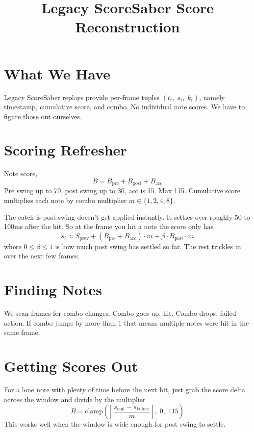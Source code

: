 \documentclass[11pt]{article}
\title{Legacy ScoreSaber Score Reconstruction}
\author{}
\date{}
\begin{document}
   \maketitle

   \section{What We Have}

   Legacy ScoreSaber replays provide per-frame tuples $(t_{i},\; s_{i},\; k_{i})$,
   namely timestamp, cumulative score, and combo. No individual note scores. We
   have to figure those out ourselves.

   \section{Scoring Refresher}

   Note score,
   \[
      B = B_{\text{pre}}+ B_{\text{post}}+ B_{\text{acc}}
   \]
   Pre swing up to 70, post swing up to 30, acc is 15. Max 115. Cumulative score
   multiplies each note by combo multiplier $m \in \{1, 2, 4, 8\}$.

   The catch is post swing doesn't get applied instantly. It settles over roughly
   50 to 100ms after the hit. So at the frame you hit a note the score only has
   \[
      s_{i} \approx S_{\text{prev}}+ (B_{\text{pre}}+ B_{\text{acc}}) \cdot m + \beta
      \cdot B_{\text{post}}\cdot m
   \]
   where $0 \le \beta \le 1$ is how much post swing has settled so far. The rest trickles
   in over the next few frames.

   \section{Finding Notes}

   We scan frames for combo changes. Combo goes up, hit. Combo drops, failed
   action. If combo jumps by more than 1 that means multiple notes were hit in the
   same frame.

   \section{Getting Scores Out}

   For a lone note with plenty of time before the next hit, just grab the score delta
   across the window and divide by the multiplier
   \[
      B = \text{clamp}\!\left(\left\lfloor \frac{s_{\text{end}}- s_{\text{before}}}{m}
      \right\rfloor,\; 0,\; 115\right)
   \]
   This works well when the window is wide enough for post swing to settle.
\end{document}
